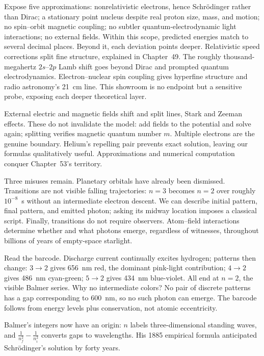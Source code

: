 
Expose five approximations: nonrelativistic electrons, hence Schrödinger rather than Dirac; a stationary point nucleus despite real proton size, mass, and motion; no spin--orbit magnetic coupling; no subtler quantum-electrodynamic light interactions; no external fields. Within this scope, predicted energies match to several decimal places. Beyond it, each deviation points deeper. Relativistic speed corrections split fine structure, explained in Chapter~49. The roughly thousand-megahertz \(2s\)--\(2p\) Lamb shift goes beyond Dirac and prompted quantum electrodynamics. Electron--nuclear spin coupling gives hyperfine structure and radio astronomy's 21~cm line. This showroom is no endpoint but a sensitive probe, exposing each deeper theoretical layer.

External electric and magnetic fields shift and split lines, Stark and Zeeman effects. These do not invalidate the model: add fields to the potential and solve again; splitting verifies magnetic quantum number \(m\). Multiple electrons are the genuine boundary. Helium's repelling pair prevents exact solution, leaving our formulas qualitatively useful. Approximations and numerical computation conquer Chapter~53's territory.

Three misuses remain. Planetary orbitals have already been dismissed. Transitions are not visible falling trajectories: \(n=3\) becomes \(n=2\) over roughly \(10^{-8}\)~s without an intermediate electron descent. We can describe initial pattern, final pattern, and emitted photon; asking its midway location imposes a classical script. Finally, transitions do not require observers. Atom--field interactions determine whether and what photons emerge, regardless of witnesses, throughout billions of years of empty-space starlight.


Read the barcode. Discharge current continually excites hydrogen; patterns then change: \(3\to2\) gives 656~nm red, the dominant pink-light contribution; \(4\to2\) gives 486~nm cyan-green; \(5\to2\) gives 434~nm blue-violet. All end at \(n=2\), the visible Balmer series. Why no intermediate colors? No pair of discrete patterns has a gap corresponding to 600~nm, so no such photon can emerge. The barcode follows from energy levels plus conservation, not atomic eccentricity.

Balmer's integers now have an origin: \(n\) labels three-dimensional standing waves, and \(\frac{1}{n_f^2}-\frac{1}{n_i^2}\) converts gaps to wavelengths. His 1885 empirical formula anticipated Schrödinger's solution by forty years.

